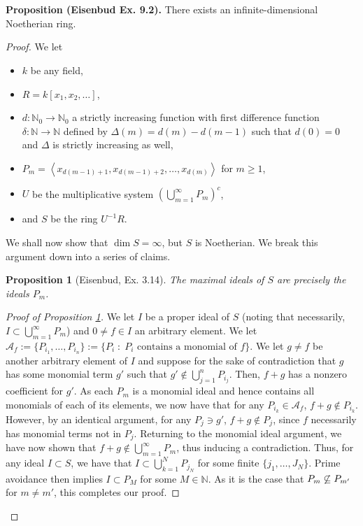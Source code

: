 \documentclass[Letter,12pt]{article}
\newcommand{\problem}[2]{
	\vspace{0.3in}
	\begin{leftbar}
		\noindent \textbf{{#1}.} {#2}
\end{leftbar} }
\renewenvironment{leftbar}{%
	\def\FrameCommand{\vrule width 1pt \relax\hspace {5pt}}
	\MakeFramed {\advance \hsize -\width \FrameRestore }
}{
	\endMakeFramed
}
\newcommand{\n}{\mathbb{N}}
\def\Acal{{\mathcal A}}
\newcommand{\<}{\left\langle}
\renewcommand{\>}{\right\rangle}
\newcommand{\idl}[1]{\left\langle{#1}\right\rangle }
\newenvironment{subproof}[1][\proofname]{%
	\renewcommand{\qedsymbol}{$\blacksquare$}%
	\begin{proof}[#1]%
	}{%
	\end{proof}%
}
\newcommand{\prob}[1]{\setcounter{section}{#1-1}\section{}}
\newtheorem{prop}[theorem]{Proposition}
\theoremstyle{definition}
\begin{document}
	
	\prob{4}
	\problem{Proposition (Eisenbud Ex. 9.2)}{There exists an infinite-dimensional Noetherian ring.}
	\begin{proof}
		We let\vspace*{-1em}\textellipsis\begin{itemize}
			
			\item $k$ be any field, \item $R=k[x_1,x_2,\ldots]$, \item $d:\n_0\to \n_0$ a strictly increasing function with first difference function $\delta: \n\to \n$ defined by $\Delta(m)=d(m)-d(m-1)$ such that $d(0)=0$ and $\Delta$ is strictly increasing as well, \item $P_m=\idl{x_{d(m-1)+1},x_{d(m-1)+2},\ldots,x_{d(m)}}$ for $m\geq 1$,\item $U$ be the multiplicative system $\left(\bigcup_{m=1}^\infty P_m\right)^c$,\item and $S$ be the ring $U^{-1}R$.
		\end{itemize}
		We shall now show that $\dim S=\infty$, but $S$ is Noetherian. We break this argument down into a series of claims.
		\begin{prop}[Eisenbud, Ex. 3.14]\label{4:claim:maxs}
			The maximal ideals of $S$ are precisely the ideals $P_m$.
		\end{prop}
		\begin{subproof}[Proof of Proposition \ref{4:claim:maxs}]
			We let $I$ be a proper ideal of $S$ (noting that necessarily, $I\subset \bigcup_{m=1}^\infty P_m$) and $0\neq f\in I$ an arbitrary element. We let $\Acal_f:=\{P_{i_1},\hdots,P_{i_n}\}:=\{P_i\;:\;P_i \text{ contains a monomial of } f\}$. We let $g\neq f$ be another arbitrary element of $I$ and suppose for the sake of contradiction that $g$ has some monomial term $g'$ such that $g'\notin \bigcup_{j=1}^nP_{i_j}$. Then, $f+g$ has a nonzero coefficient for $g'$. As each $P_m$ is a monomial ideal and hence contains all monomials of each of its elements, we now have that for any $P_{i_k}\in \Acal_f$, $f+g\notin P_{i_k}$. However, by an identical argument, for any $P_j\ni g'$, $f+g\notin P_j$, since $f$ necessarily has monomial terms not in $P_j$. Returning to the monomial ideal argument, we have now shown that $f+g\notin \bigcup_{m=1}^\infty P_m$, thus inducing a contradiction. Thus, for any ideal $I\subset S$, we have that $I\subset \bigcup_{k=1}^N P_{j_N}$ for some finite $\{j_1,\hdots,J_N\}$. Prime avoidance then implies $I\subset P_M$ for some $M\in \n$. As it is the case that $P_m\centernot\subseteq P_{m'}$ for $m\neq m'$, this completes our proof.

\end{subproof}
\end{proof}
\end{document}
